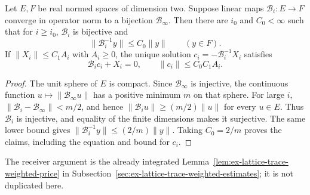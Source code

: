 \begin{lemma}
\label{lem:ex-lattice-trace-stable-inversion}
Let $E,F$ be real normed spaces of dimension two. Suppose linear maps
$\mathcal B_i:E\to F$ converge in operator norm to a bijection
$\mathcal B_\infty$. Then there are $i_0$ and $C_0<\infty$ such that for
$i\geq i_0$, $\mathcal B_i$ is bijective and
\[
 \|\mathcal B_i^{-1}y\|\leq C_0\|y\|\qquad(y\in F).
\]
If $\|X_i\|\leq C_1 A_i$ with $A_i\geq0$, the unique solution
$c_i=-\mathcal B_i^{-1}X_i$ satisfies
\[
 \mathcal B_i c_i+X_i=0,
 \qquad \|c_i\|\leq C_0C_1A_i.
\]
\end{lemma}
\begin{proof}
The unit sphere of $E$ is compact. Since $\mathcal B_\infty$ is injective,
the continuous function $u\mapsto\|\mathcal B_\infty u\|$ has a positive
minimum $m$ on that sphere. For large $i$,
$\|\mathcal B_i-\mathcal B_\infty\|<m/2$, and hence
$\|\mathcal B_i u\|\geq(m/2)\|u\|$ for every $u\in E$. Thus $\mathcal
B_i$ is injective, and equality of the finite dimensions makes it
surjective. The same lower bound gives
$\|\mathcal B_i^{-1}y\|\leq(2/m)\|y\|$. Taking $C_0=2/m$ proves the
claims, including the equation and bound for $c_i$.
\end{proof}

The receiver argument is the already integrated
Lemma~\ref{lem:ex-lattice-trace-weighted-price} in
Subsection~\ref{sec:ex-lattice-trace-weighted-estimates}; it is not duplicated here.


